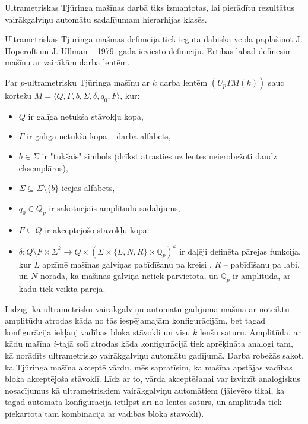 \documentclass{ludis}
\begin{document}

Ultrametriskas Tjūringa mašīnas darbā tiks izmantotas, lai pierādītu rezultātus vairākgalviņu automātu sadalījumam hierarhijas klasēs.

Ultrametriskas Tjūringa mašīnas definīcija tiek iegūta dabiskā veida paplašinot J. Hopcroft un J. Ullman ~\citep{Hopcroft1979} 1979. gadā ieviesto definīciju. Ērtības labad definēsim mašīnu ar vairākām darba lentēm.
\begin{definicija}
Par $p$-ultrametrisku Tjūringa mašīnu ar $k$ darba lentēm $(U_pTM(k))$ sauc kortežu $M= \langle Q, \Gamma, b, \Sigma, \delta, q_0, F \rangle$, kur:
\begin{itemize}
	\item $Q$ ir galīga netukša stāvokļu kopa,
	\item $\Gamma$ ir galīga netukša kopa -- darba alfabēts,
	\item $b \in \Sigma$ ir "tukšais" simbols (drīkst atrasties uz lentes neierobežoti daudz eksemplāros),
	\item $\Sigma\subseteq\Sigma\setminus\{b\}$ ieejas alfabēts,
	\item $q_0 \in Q_p$ ir sākotnējais amplitūdu sadalījums,
	\item $F \subseteq Q$ ir akceptējošo stāvokļu kopa.
	\item $\delta: Q \setminus F \times \Sigma^k \rightarrow Q \times \left(\Sigma \times \{L,N,R\} \times \mathbb{Q}_p \right)^k$ ir daļēji definēta pārejas funkcija, kur $L$ apzīmē mašīnas galviņas pabīdīšanu pa kreisi , $R$ -- pabīdīšanu pa labi, un $N$ norāda, ka mašīnas galviņa netiek pārvietota, un $\mathbb{Q}_p$ ir amplitūda, ar kādu tiek veikta pāreja.
\end{itemize}
\end{definicija}

Līdzīgi kā ultrametrisku vairākgalviņu automātu gadījumā mašīna ar noteiktu amplitūdu atrodas kāda no tās iespējamajām konfigurācijām, bet tagad konfigurācija iekļauj vadības bloka stāvokli un visu $k$ lenšu saturu. Amplitūda, ar kādu mašīna $i$-tajā solī atrodas kāda konfigurācijā tiek aprēķināta analogi tam, kā norādīts ultrametrisko vairākgalviņu automātu gadījumā. Darba robežās sakot, ka Tjūringa mašīna akceptē vārdu, mēs sapratīsim, ka mašīna apstājas vadības bloka akceptējoša stāvoklī. Līdz ar to, vārda akceptēšanai var izvirzīt analoģiskus nosacījumus kā ultrametriskiem vairākgalviņu automātiem (jāievēro tikai, ka tagad automāta konfigurācijā ietilpst arī no lentes saturs, un amplitūda tiek piekārtota tam kombinācijā ar vadības bloka stāvokli).
\end{document}
